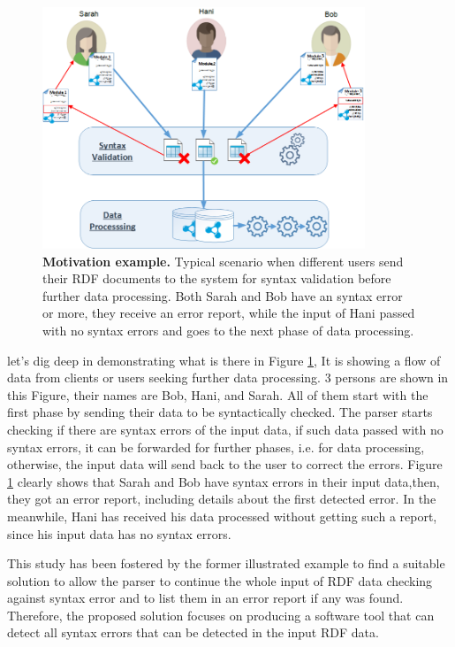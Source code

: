 	\begin{figure}
			\includegraphics[width=0.86\textwidth]{images/motivation.png}
			\caption{\textbf{Motivation example.} Typical scenario when different users send their RDF documents to the system for syntax validation before further data processing.
			Both Sarah and Bob have an syntax error or more, they receive an error report, while the input of Hani passed with no syntax errors and goes to the next phase of data processing.}
			\label{Fig:Motivation}
	\end{figure}

let's dig deep in demonstrating what is there in  {Figure \ref{Fig:Motivation}}, It is showing a flow of data from clients or users seeking further data processing. 3 persons are shown in this Figure, their names are Bob, Hani, and Sarah. All of them start with the first phase by sending their data to be syntactically checked. The parser starts checking if there are syntax errors of the input data, if such data passed with no syntax errors, it can be forwarded for further phases, i.e. for data processing, otherwise, the input data will send back to the user to correct the errors. {Figure \ref{Fig:Motivation}} clearly shows that Sarah and Bob have syntax errors in their input data,then, they got an error report, including details about the first detected error. In the meanwhile, Hani has received his data processed without getting such a report, since his input data has no syntax errors. 

This study has been fostered by the former illustrated example to find a suitable solution to allow the parser to continue the whole input of RDF data checking against syntax error and to list them in an error report if any was found. Therefore, the proposed solution focuses on producing a software tool that can detect all syntax errors that can be detected in the input RDF data. 

